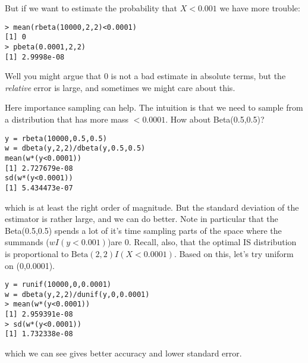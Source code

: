 \documentclass[11pt]{article}
\def\B{\text{Beta}}
\begin{document}
But if we want to estimate the probability that
$X<0.001$ we have more trouble:
\begin{verbatim}
> mean(rbeta(10000,2,2)<0.0001)
[1] 0
> pbeta(0.0001,2,2)
[1] 2.9998e-08
 \end{verbatim}
Well you might argue that 0 is not a bad estimate in absolute terms, but the {\it relative} error is large,
and sometimes we might care about this.

Here importance sampling can help. The intuition is that we need to sample from a distribution that has more mass $< 0.0001$. How about Beta(0.5,0.5)?
\begin{verbatim}
y = rbeta(10000,0.5,0.5)
w = dbeta(y,2,2)/dbeta(y,0.5,0.5) 
mean(w*(y<0.0001))
[1] 2.727679e-08
sd(w*(y<0.0001))
[1] 5.434473e-07
\end{verbatim}
which is at least the right order of magnitude.
But the standard deviation of the estimator is rather large, and we can do better. Note in particular that
the Beta(0.5,0.5) spends a lot of it's time sampling parts of the space where the summands ($w I(y<0.001)$)are 0. Recall, also, that the optimal IS distribution is proportional to $\B(2,2)I(X<0.0001)$. Based on this, let's try uniform on (0,0.0001).
\begin{verbatim}
y = runif(10000,0,0.0001)
w = dbeta(y,2,2)/dunif(y,0,0.0001) 
> mean(w*(y<0.0001))
[1] 2.959391e-08 
> sd(w*(y<0.0001))
[1] 1.732338e-08
\end{verbatim}
which we can see gives better accuracy and lower standard error.
\end{document}
